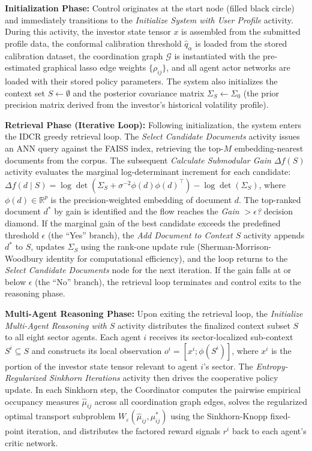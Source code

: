 \documentclass[12pt,a4paper,oneside]{report}
\theoremstyle{definition}
\theoremstyle{remark}
\begin{document}
\textbf{Initialization Phase:} Control originates at the start node (filled black circle) and immediately transitions to the \emph{Initialize System with User Profile} activity. During this activity, the investor state tensor $x$ is assembled from the submitted profile data, the conformal calibration threshold $\hat{q}_\alpha$ is loaded from the stored calibration dataset, the coordination graph $\mathcal{G}$ is instantiated with the pre-estimated graphical lasso edge weights $\{\rho_{ij}\}$, and all agent actor networks are loaded with their stored policy parameters. The system also initializes the context set $S \leftarrow \emptyset$ and the posterior covariance matrix $\Sigma_S \leftarrow \Sigma_0$ (the prior precision matrix derived from the investor's historical volatility profile).

\textbf{Retrieval Phase (Iterative Loop):} Following initialization, the system enters the IDCR greedy retrieval loop. The \emph{Select Candidate Documents} activity issues an ANN query against the FAISS index, retrieving the top-$M$ embedding-nearest documents from the corpus. The subsequent \emph{Calculate Submodular Gain $\Delta f(S)$} activity evaluates the marginal log-determinant increment for each candidate: $\Delta f(d \mid S) = \log \det(\Sigma_S + \sigma^{-2} \phi(d)\phi(d)^\top) - \log \det(\Sigma_S)$, where $\phi(d) \in \mathbb{R}^p$ is the precision-weighted embedding of document $d$. The top-ranked document $d^*$ by gain is identified and the flow reaches the \emph{Gain $> \epsilon$?} decision diamond. If the marginal gain of the best candidate exceeds the predefined threshold $\epsilon$ (the ``Yes'' branch), the \emph{Add Document to Context $S$} activity appends $d^*$ to $S$, updates $\Sigma_S$ using the rank-one update rule (Sherman-Morrison-Woodbury identity for computational efficiency), and the loop returns to the \emph{Select Candidate Documents} node for the next iteration. If the gain falls at or below $\epsilon$ (the ``No'' branch), the retrieval loop terminates and control exits to the reasoning phase.

\textbf{Multi-Agent Reasoning Phase:} Upon exiting the retrieval loop, the \emph{Initialize Multi-Agent Reasoning with $S$} activity distributes the finalized context subset $S$ to all eight sector agents. Each agent $i$ receives its sector-localized sub-context $S^i \subseteq S$ and constructs its local observation $o^i = [x^i; \phi(S^i)]$, where $x^i$ is the portion of the investor state tensor relevant to agent $i$'s sector. The \emph{Entropy-Regularized Sinkhorn Iterations} activity then drives the cooperative policy update. In each Sinkhorn step, the Coordinator computes the pairwise empirical occupancy measures $\hat{\mu}_{ij}$ across all coordination graph edges, solves the regularized optimal transport subproblem $W_\varepsilon(\hat{\mu}_{ij}, \mu^*_{ij})$ using the Sinkhorn-Knopp fixed-point iteration, and distributes the factored reward signals $r^i$ back to each agent's critic network.
\end{document}
